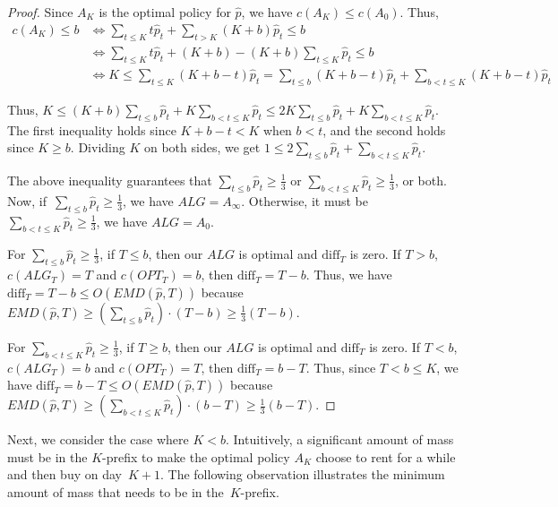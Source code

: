 \begin{proof}
    Since $A_K$ is the optimal policy for $\hat{p}$, we have $c(A_K) \leq c(A_0)$. Thus,
    \begin{align*}
    c(A_K) \leq b &\iff \sum_{t \leq K} t\hat{p}_t + \sum_{t>K} (K+b)\hat{p}_t \leq b \\
    &\iff \sum_{t \leq K} t\hat{p}_t + (K+b) - (K+b)\sum_{t \leq K} \hat{p}_t \leq b \\
    &\iff K \leq \sum_{t \leq K} (K+b-t) \hat{p}_t = \sum_{t \leq b} (K+b-t) \hat{p}_t + \sum_{b < t \leq K} (K+b-t) \hat{p}_t
    \end{align*}

    Thus, $K \leq (K+b)\sum_{t \leq b}\hat{p}_t + K \sum_{b < t \leq K} \hat{p}_t \leq 2K \sum_{t \leq b}\hat{p}_t + K \sum_{b < t \leq K} \hat{p}_t$. The first inequality holds since $K+b-t<K$ when $b<t$, and the second holds since $K \geq b$. Dividing $K$ on both sides, we get $1 \leq 2\sum_{t \leq b}\hat{p}_t + \sum_{b < t \leq K} \hat{p}_t$.

    The above inequality guarantees that $\sum_{t \leq b}\hat{p}_t \geq \frac{1}{3}$ or $\sum_{b < t \leq K} \hat{p}_t \geq \frac{1}{3}$, or both. Now, if~$\sum_{t \leq b}\hat{p}_t \geq \frac{1}{3}$, we have $ALG = A_\infty$. Otherwise, it must be $\sum_{b < t \leq K} \hat{p}_t \geq \frac{1}{3}$, we have $ALG=A_0$.

    For $\sum_{t \leq b}\hat{p}_t \geq \frac{1}{3}$, if $T \leq b$, then our $ALG$ is optimal and $\text{diff}_T$ is zero. If $T>b$, $c(ALG_T)=T$ and $c(OPT_T)=b$, then $\text{diff}_T = T-b$. Thus, we have $\text{diff}_T = T-b \leq O(EMD(\hat{p},T))$ because $EMD(\hat{p},T) \geq (\sum_{t \leq b}\hat{p}_t)\cdot(T-b)\geq \frac{1}{3}(T-b)$.

    For $\sum_{b < t \leq K} \hat{p}_t \geq \frac{1}{3}$, if $T \geq b$, then our $ALG$ is optimal and $\text{diff}_T$ is zero. If $T<b$, $c(ALG_T)=b$ and $c(OPT_T)=T$, then $\text{diff}_T = b-T$. Thus, since $T<b \leq K$, we have $\text{diff}_T = b-T \leq O(EMD(\hat{p},T))$ because $EMD(\hat{p},T) \geq (\sum_{b < t \leq K} \hat{p}_t)\cdot(b-T)\geq \frac{1}{3}(b-T)$.
\end{proof}

Next, we consider the case where $K<b$. Intuitively, a significant amount of mass must be in the $K$-prefix to make the optimal policy $A_K$ choose to rent for a while and then buy on day~$K+1$. The following observation illustrates the minimum amount of mass that needs to be in the~$K$-prefix.


